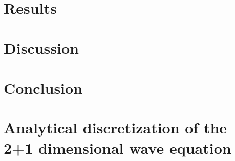 \documentclass[english,notitlepage,reprint,nofootinbib]{revtex4-1}  %
\begin{document}
\section{Results}\label{sec:results}
%

\section{Discussion}\label{sec:discussion}
%


\section{Conclusion}\label{sec:conclusion}

\onecolumngrid

%


\newpage
\appendix

\section{Analytical discretization of the 2+1 dimensional wave equation} \label{appendix:analytic}
\end{document}

